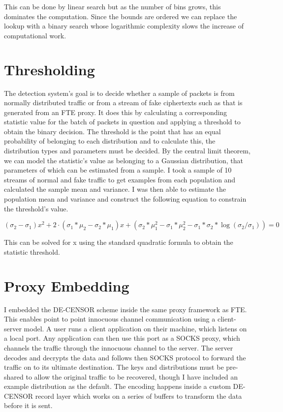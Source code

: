 \documentclass[ %
                    author={Samuel Russell},
                supervisor={Prof. Bogdan Warinschi},
                    degree={MEng},
                     title={Innocuous Ciphertexts},
                  subtitle={The DE-CENSOR Scheme},
                      type={research},
                      year={2018} ]{dissertation}
\begin{document}
This can be done by linear search but as the number of bins grows, this dominates the computation.
Since the bounds are ordered we can replace the lookup with a binary search whose logarithmic complexity slows the increase of computational work.

\section{Thresholding}\label{sec:thresholding}

The detection system's goal is to decide whether a sample of packets is from normally distributed traffic or from a stream of fake ciphertexts such as that is generated from an FTE proxy.
It does this by calculating a corresponding statistic value for the batch of packets in question and applying a threshold to obtain the binary decision.
The threshold is the point that has an equal probability of belonging to each distribution and to calculate this, the distribution types and parameters must be decided.
By the central limit theorem, we can model the statistic's value as belonging to a Gaussian distribution, that parameters of which can be estimated from a sample.
I took a sample of 10 streams of normal and fake traffic to get examples from each population and calculated the sample mean and variance. I was then able to estimate the population mean and variance and construct the following equation to constrain the threshold's value.

$$(\sigma_2-\sigma_1) x^2 + 2\cdot (\sigma_1*\mu_2 - \sigma_2*\mu_1) x +  (\sigma_2*\mu_1^2 - \sigma_1*\mu_2^2 - \sigma_1*\sigma_2*\log(\sigma_2/\sigma_1)) = 0$$

This can be solved for x using the standard quadratic formula to obtain the statistic threshold.

\section{Proxy Embedding}

I embedded the DE-CENSOR scheme inside the same proxy framework as FTE.
This enables point to point innocuous channel communication using a client-server model.
A user runs a client application on their machine, which listens on a local port.
Any application can then use this port as a SOCKS proxy, which channels the traffic through the innocuous channel to the server.
The server decodes and decrypts the data and follows then SOCKS protocol to forward the traffic on to its ultimate destination.
The keys and distributions must be pre-shared to allow the original traffic to be recovered, though I have included an example distribution as the default.
The encoding happens inside a custom DE-CENSOR record layer which works on a series of buffers to transform the data before it is sent.
\end{document}
